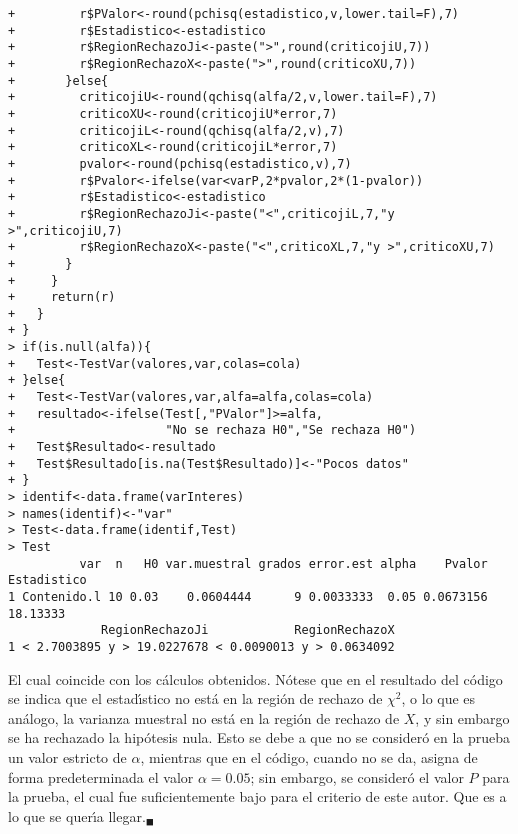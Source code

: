 \begin{solucion}
\begin{verbatim}
+         r$PValor<-round(pchisq(estadistico,v,lower.tail=F),7)
+         r$Estadistico<-estadistico
+         r$RegionRechazoJi<-paste(">",round(criticojiU,7))
+         r$RegionRechazoX<-paste(">",round(criticoXU,7))
+       }else{
+         criticojiU<-round(qchisq(alfa/2,v,lower.tail=F),7)
+         criticoXU<-round(criticojiU*error,7)
+         criticojiL<-round(qchisq(alfa/2,v),7)
+         criticoXL<-round(criticojiL*error,7)
+         pvalor<-round(pchisq(estadistico,v),7)
+         r$Pvalor<-ifelse(var<varP,2*pvalor,2*(1-pvalor))
+         r$Estadistico<-estadistico
+         r$RegionRechazoJi<-paste("<",criticojiL,7,"y >",criticojiU,7)
+         r$RegionRechazoX<-paste("<",criticoXL,7,"y >",criticoXU,7)
+       }
+     }
+     return(r)
+   }
+ }
> if(is.null(alfa)){
+   Test<-TestVar(valores,var,colas=cola)
+ }else{
+   Test<-TestVar(valores,var,alfa=alfa,colas=cola)
+   resultado<-ifelse(Test[,"PValor"]>=alfa,
+                     "No se rechaza H0","Se rechaza H0")
+   Test$Resultado<-resultado
+   Test$Resultado[is.na(Test$Resultado)]<-"Pocos datos"
+ }
> identif<-data.frame(varInteres)
> names(identif)<-"var"
> Test<-data.frame(identif,Test)
> Test
          var  n   H0 var.muestral grados error.est alpha    Pvalor Estadistico
1 Contenido.l 10 0.03    0.0604444      9 0.0033333  0.05 0.0673156    18.13333
             RegionRechazoJi            RegionRechazoX
1 < 2.7003895 y > 19.0227678 < 0.0090013 y > 0.0634092
 \end{verbatim}
 El cual coincide con los c\'alculos obtenidos.
 N\'otese que en el resultado del c\'odigo se indica que el estad\'{\i}stico
 no est\'a en la regi\'on de rechazo de $\chi^2$,
 o lo que es an\'alogo, la varianza muestral no est\'a en la regi\'on de rechazo
 de $X$, y sin embargo se ha rechazado la hip\'otesis nula.
 Esto se debe a que no se consider\'o en la prueba un valor estricto de $\alpha$,
 mientras que en el c\'odigo, cuando no se da, asigna de forma predeterminada
 el valor $\alpha=0.05$; sin embargo, se consider\'o el valor $P$ para la prueba,
 el cual fue suficientemente bajo para el criterio de este autor.
 Que es a lo que se quer\'{\i}a llegar.${}_{\blacksquare}$
\end{solucion}
